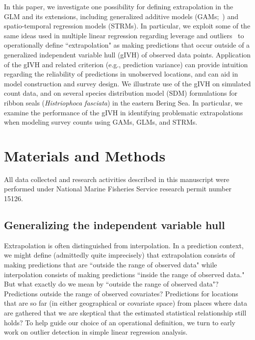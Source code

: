 \documentclass[10pt,letterpaper]{article}
\begin{document}
In this paper, we investigate one possibility for defining extrapolation in the GLM and its extensions, including generalized additive models (GAMs;~\cite{HastieTibshirani1999,Wood2006}) and spatio-temporal regression models (STRMs).  In particular, we exploit some of the same ideas used in multiple linear regression regarding leverage and outliers~\cite{Cook1979} to operationally define ``extrapolation" as making predictions that occur outside of a generalized independent variable hull (gIVH) of observed data points. Application of the gIVH and related criterion (e.g., prediction variance) can provide intuition regarding the reliability of predictions in unobserved locations, and can aid in model construction and survey design. We illustrate use of the gIVH on simulated count data, and on several species distribution model (SDM) formulations for ribbon seals ({\it Histriophoca fasciata}) in the eastern Bering Sea.  In particular, we examine the performance of the gIVH in identifying problematic extrapolations when modeling survey counts using GAMs, GLMs, and STRMs.
\section*{Materials and Methods}

All data collected and research activities described in this manuscript were performed under National Marine Fisheries Service research permit number 15126.

\subsection*{Generalizing the independent variable hull}

Extrapolation is often distinguished from interpolation.  In a prediction context, we might define (admittedly quite imprecisely) that extrapolation consists of making predictions that are ``outside the range of observed data" while interpolation consists of making predictions ``inside the range of observed data."  But what exactly do we mean by ``outside the range of observed data"?  Predictions outside the range of observed covariates?  Predictions for locations that are so far (in either geographical or covariate space) from places where data are gathered that we are skeptical that the estimated statistical relationship still holds? To help guide our choice of an operational definition, we turn to early work on outlier detection in simple linear regression analysis.
\end{document}

